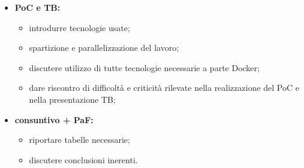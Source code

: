 \begin{itemize}
\begin{itemize}
\begin{itemize}
            \item pianificazione preventiva, di periodo e riscontro;
        \end{itemize}
    \end{itemize}
    \item \textbf{PoC e TB:}
    \begin{itemize}
        \item introdurre tecnologie usate;
        \item spartizione e parallelizzazione del lavoro;
        \item discutere utilizzo di tutte tecnologie necessarie a parte Docker;
        \item dare riscontro di difficoltà e criticità rilevate nella realizzazione del PoC e nella presentazione TB;
    \end{itemize}
    \item \textbf{consuntivo + PaF:}
    \begin{itemize}
        \item riportare tabelle necessarie;
        \item discutere conclusioni inerenti.
    \end{itemize}
\end{itemize}